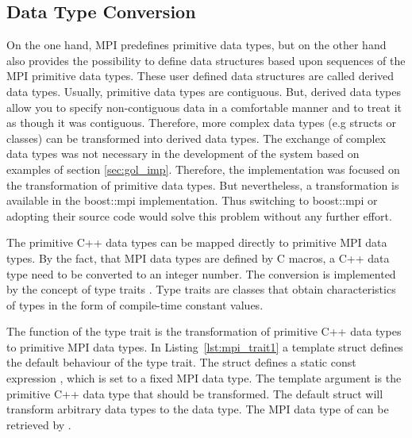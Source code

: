 \subsection{Data Type Conversion}
\label{sec:data_type_conversion}
On the one hand, MPI predefines primitive data types, but on the other hand also provides 
 the possibility to define data structures based
upon sequences of the MPI primitive data types. These user defined data
structures are called derived data types. Usually, primitive data
types are contiguous. But, derived data types allow you to specify
non-contiguous data in a comfortable manner and to treat it as though
it was contiguous.  Therefore, more complex data types (e.g structs or
classes) can be transformed into derived data types. The exchange
of complex data types was not necessary in the development of the
system based on examples of section \ref{sec:gol_imp}. Therefore, the
implementation was focused on the transformation of primitive data
types.  But nevertheless, a transformation is available in the
boost::mpi \cite{ref:boost_mpi} implementation. Thus switching to
boost::mpi or adopting their source code would solve this problem
without any further effort.

The primitive C++ data types can be mapped directly to primitive MPI
data types. By the fact, that MPI data types are defined by C macros,
a C++ data type need to be converted to an integer number. The
conversion is implemented by the concept of type traits
\cite{ref:type_trait}.  Type traits are classes that obtain
characteristics of types in the form of compile-time constant values.

The function of the type trait is the transformation of primitive C++
data types to primitive MPI data types.  In
Listing~\ref{lst:mpi_trait1} a template struct defines the default
behaviour of the type trait. The struct defines a static const
expression , which is set to a fixed MPI data type. The
template argument  is the primitive C++ data type that
should be transformed. The default struct will transform arbitrary
data types  to the  data type. The MPI data
type of  can be retrieved by
.


